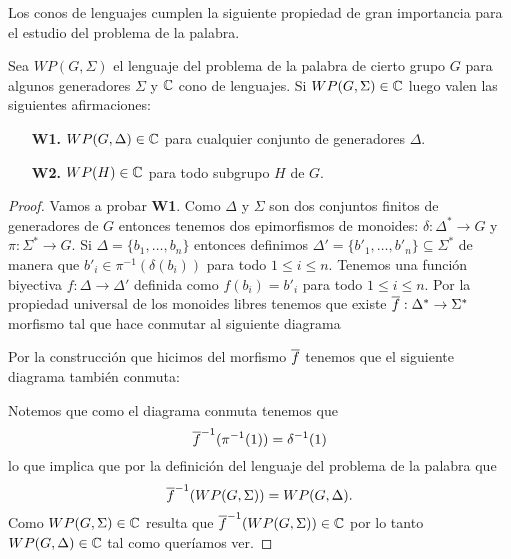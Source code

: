 \documentclass[tesis.tex]{subfiles}
\begin{document}
Los conos de lenguajes cumplen la siguiente propiedad de gran importancia para el estudio del problema de la palabra.
\medskip
\begin{prop}\label{prop-cono-wp}
	Sea $WP(G, \Sigma)$ el lenguaje del problema de la palabra de cierto grupo $G$ para algunos generadores $\Sigma$ y $\mathbb{C}$ cono de lenguajes. 
	Si $WP(G, \Sigma) \in \mathbb{C}$ luego valen las siguientes afirmaciones:
	\begin{itemize}
		\item[\textbf{W1.}] $WP(G, \Delta) \in \mathbb{C}$ para cualquier conjunto de generadores $\Delta$.
		\item[\textbf{W2.}] $WP(H) \in \mathbb{C}$ para todo subgrupo $H$ \fg de $G$.
	\end{itemize} 
\end{prop}
\begin{proof}
	Vamos a probar \textbf{W1}.
	Como $\Delta$ y $\Sigma$ son dos conjuntos finitos de generadores de $G$ entonces tenemos dos epimorfismos de monoides:
	$\delta: \Delta^* \to G$ y $\pi:\Sigma^* \to G$.
	Si $\Delta = \{ b_{1}, \dots, b_{n} \}$ entonces definimos $\Delta' = \{ b'_{1}, \dots, b'_{n}   \} \subseteq \Sigma^*$ de manera que $b'_{i} \in \pi^{-1}(\delta(b_{i}))$ para todo $1 \le i \le n$.
	Tenemos una función biyectiva $f:\Delta \to \Delta'$ definida como $f(b_{i}) = b'_{i}$ para todo $1 \le i \le n$.
	Por la propiedad universal de los monoides libres tenemos que existe $\overline f: \Delta^* \to \Sigma^*$ morfismo tal que hace conmutar al siguiente diagrama
	\begin{center}
	\end{center}
	
	Por la construcción que hicimos del morfismo $\overline f$ tenemos que el siguiente diagrama también conmuta:
	\begin{center}
	\end{center}
	
	Notemos que como el diagrama conmuta tenemos que 
	\[
	\overline{f}^{-1}(\pi^{-1}(1)) = \delta^{-1}(1)
	\]
	lo que implica que por la definición del lenguaje del problema de la palabra que
	\[
	\overline{f}^{-1}(WP(G,\Sigma)) = WP(G, \Delta).
	\]
	Como $WP(G, \Sigma) \in \mathbb{C}$ resulta que $\overline{f}^{-1}(WP(G,\Sigma)) \in \mathbb{C}$ por lo tanto $WP(G, \Delta) \in \mathbb{C}$ tal como queríamos ver.
	

\end{proof}
\end{document}
